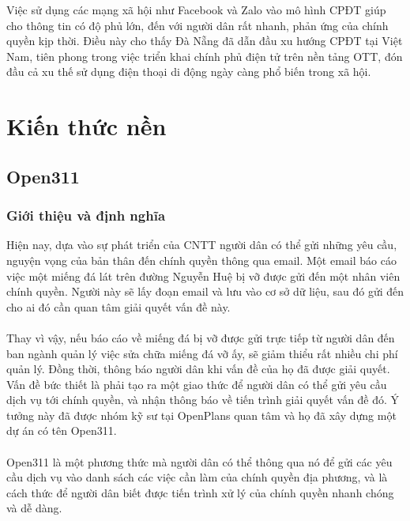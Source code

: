 \documentclass[a4paper]{article}
\begin{document}
Việc sử dụng các mạng xã hội như Facebook và Zalo vào mô hình CPĐT giúp cho thông tin có độ phủ lớn, đến với người dân rất nhanh, phản ứng của chính quyền kịp thời. Điều này cho thấy Đà Nẵng đã dẫn đầu xu hướng CPĐT tại Việt Nam, tiên phong trong việc triển khai chính phủ điện tử trên nền tảng OTT, đón đầu cả xu thế sử dụng điện thoại di động ngày càng phổ biến trong xã hội.
\section{Kiến thức nền}
\subsection{Open311}
\subsubsection{Giới thiệu và định nghĩa}
Hiện nay, dựa vào sự phát triển của CNTT người dân có thể gửi những yêu cầu, nguyện vọng của bản thân đến chính quyền thông qua email. Một email báo cáo việc một miếng đá lát trên đường Nguyễn Huệ bị vỡ được gửi đến một nhân viên chính quyền. Người này sẽ lấy đoạn email và lưu vào cơ sở dữ liệu, sau đó gửi đến cho ai đó cần quan tâm giải quyết vấn đề này.\\
\\
Thay vì vậy, nếu báo cáo về miếng đá bị vỡ được gửi trực tiếp từ người dân đến ban ngành quản lý việc sửa chữa miếng đá vỡ ấy, sẽ giảm thiểu rất nhiều chi phí quản lý. Đồng thời, thông báo người dân khi vấn đề của họ đã được giải quyết. Vấn đề bức thiết là phải tạo ra một giao thức để người dân có thể gửi yêu cầu dịch vụ tới chính quyền, và nhận thông báo về tiến trình giải quyết vấn đề đó. Ý tưởng này đã được nhóm kỹ sư tại OpenPlans quan tâm và họ đã xây dựng một dự án có tên Open311.\\
\\
Open311 là một phương thức mà người dân có thể thông qua nó để gửi các yêu cầu dịch vụ vào danh sách các việc cần làm của chính quyền địa phương, và là cách thức để người dân biết được tiến trình xử lý của chính quyền nhanh chóng và dễ dàng.
\end{document}
